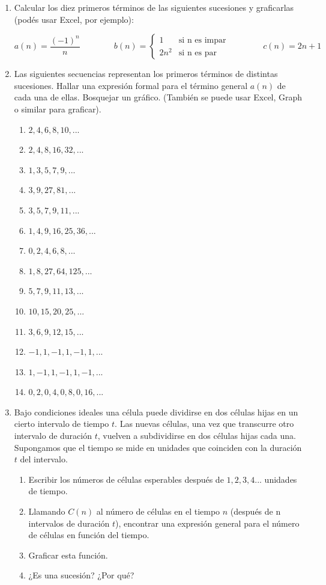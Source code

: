 \documentclass[12pt]{article}
\theoremstyle{definition}
\begin{document}
\begin{enumerate}

\item Calcular los diez primeros términos de las siguientes sucesiones y graficarlas (podés usar Excel, por ejemplo):

\begin{equation*}
a(n) = \frac{(-1)^n}{n} \qquad \qquad
b(n)= 
\begin{cases} 
 1 & \text{si  n es impar} \\
 2n^2 & \text{si  n es par}
\end{cases} \qquad \qquad
c(n) = 2n + 1
\end{equation*}

\item Las siguientes secuencias representan los primeros términos de distintas sucesiones. Hallar una expresión formal para el término general $a(n)$ de cada una de ellas. Bosquejar un gráfico. (También se puede usar Excel, Graph o similar para graficar).
\begin{multicols}{3}
\begin{enumerate}
\setlength\itemsep{0em}
\item $2,4,6,8,10, ...$
\item $2,4,8,16,32, ...$
\item $1,3,5,7,9, ...$
\item $3,9,27,81,...$
\item $3,5,7,9,11, ...$
\item $1,4,9,16,25,36, ...$
\item $ 0,2,4,6,8, ...$
\item $1,8,27,64,125, ...$ 
\item $5, 7, 9, 11,13, ...$
\item $ 10, 15, 20,25, ...$
\item $3, 6, 9, 12,15, ...$
\item $-1, 1, -1, 1, -1, 1, ...$
\item $1, -1, 1, -1, 1, -1, ...$
\item $0, 2, 0, 4, 0, 8, 0, 16, ...$
\end{enumerate}
\end{multicols}

\item Bajo condiciones ideales una célula puede dividirse en dos células hijas en un cierto intervalo de tiempo $t$. Las nuevas células, una vez que transcurre otro intervalo de duración $t$, vuelven a subdividirse en dos células hijas cada una. Supongamos que el tiempo se mide en unidades que coinciden con la duración $t$ del intervalo.
\begin{enumerate}
\setlength\itemsep{0em}
\item Escribir los números de células esperables después de $1, 2, 3, 4...$ unidades de tiempo.
\item Llamando $C(n)$ al número de células en el tiempo $n$ (después de n intervalos de duración $t$), encontrar una expresión general para el número de células en función del tiempo.
\item Graficar esta función. 
\item ¿Es una sucesión? ¿Por qué?
\end{enumerate}
 

\end{enumerate}
\end{document}
